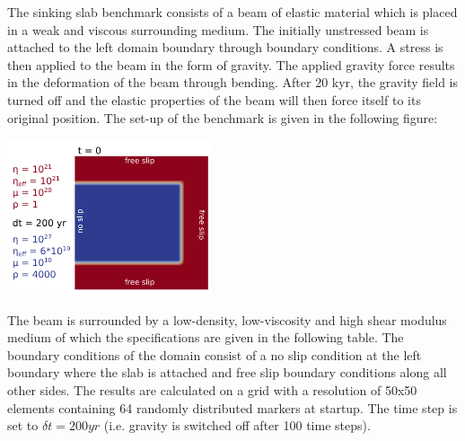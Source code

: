 The sinking slab benchmark consists of a beam of elastic material which is placed 
in a weak and viscous surrounding medium. The initially unstressed beam is attached 
to the left domain boundary through boundary conditions. A stress is then applied to 
the beam in the form of gravity. The applied gravity force results in the deformation 
of the beam through bending. After 20 kyr, the gravity field is turned off and the 
elastic properties of the beam will then force itself to its original position.  
The set-up of the benchmark is given in the following figure: 

\begin{center}
\includegraphics[width=6cm]{python_codes/fieldstone_64/images/poster_benchmark.png}\\
\end{center}

The beam is surrounded by a low-density, low-viscosity and high shear modulus medium 
of which the specifications are given in  the following table.
The boundary conditions of the domain consist of a no slip condition at 
the left boundary where the slab is attached and free slip boundary conditions along all other sides. 
The results are calculated on a grid with a resolution of 50x50 elements containing 64 randomly 
distributed markers at startup.
The time step is set to $\delta t = 200yr$ (i.e. gravity is switched off after 100 time steps).


